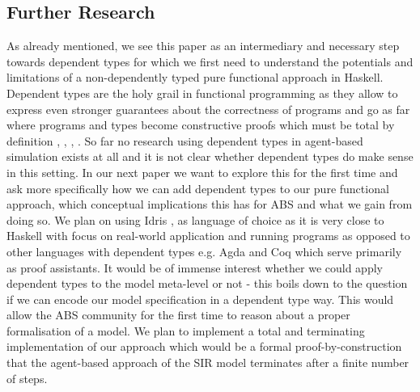 \subsection{Further Research}
As already mentioned, we see this paper as an intermediary and necessary step towards dependent types for which we first need to understand the potentials and limitations of a non-dependently typed pure functional approach in Haskell. Dependent types are the holy grail in functional programming as they allow to express even stronger guarantees about the correctness of programs and go as far where programs and types become constructive proofs \cite{wadler_propositions_2015} which must be total by definition \cite{thompson_type_1991}, \cite{altenkirch_why_2005}, \cite{altenkirch_pi_sigma:_2010}, \cite{program_homotopy_2013}. So far no research using dependent types in agent-based simulation exists at all and it is not clear whether dependent types do make sense in this setting. In our next paper we want to explore this for the first time and ask more specifically how we can add dependent types to our pure functional approach, which conceptual implications this has for ABS and what we gain from doing so. We plan on using Idris \cite{brady_idris_2013}, \cite{brady_type-driven_2017} as language of choice as it is very close to Haskell with focus on real-world application and running programs as opposed to other languages with dependent types e.g. Agda and Coq which serve primarily as proof assistants.
It would be of immense interest whether we could apply dependent types to the model meta-level or not - this boils down to the question if we can encode our model specification in a dependent type way. This would allow the ABS community for the first time to reason about a proper formalisation of a model. We plan to implement a total and terminating implementation of our approach which would be a formal proof-by-construction that the agent-based approach of the SIR model terminates after a finite number of steps.
